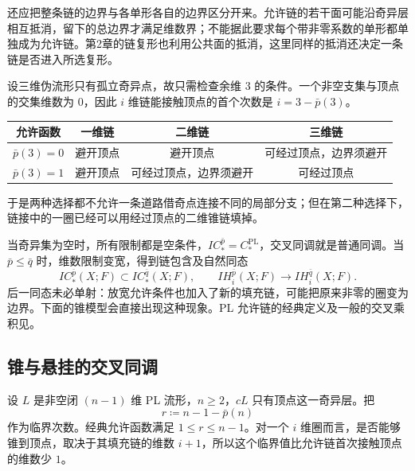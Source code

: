 \ProseParagraphBreak

还应把整条链的边界与各单形各自的边界区分开来。允许链的若干面可能沿奇异层相互抵消，留下的总边界才满足维数界；不能据此要求每个带非零系数的单形都单独成为允许链。第2章的链复形也利用公共面的抵消，这里同样的抵消还决定一条链是否进入所选复形。

\begin{example}\label{g2:exm:allowable-isolated-three-point}
	设三维伪流形只有孤立奇异点，故只需检查余维 \(3\) 的条件。一个非空支集与顶点的交集维数为 \(0\)，因此 \(i\) 维链能接触顶点的首个次数是 \(i=3-\bar p(3)\)。
	\begin{center}
		\begin{tabular}{@{}c c c c@{}}
			\toprule
			允许函数 & 一维链 & 二维链 & 三维链 \\
			\midrule
			\(\bar p(3)=0\) & 避开顶点 & 避开顶点 & 可经过顶点，边界须避开 \\
			\(\bar p(3)=1\) & 避开顶点 & 可经过顶点，边界须避开 & 可经过顶点 \\
			\bottomrule
		\end{tabular}
	\end{center}
	于是两种选择都不允许一条道路借奇点连接不同的局部分支；但在第二种选择下，链接中的一圈已经可以用经过顶点的二维锥链填掉。
\end{example}

当奇异集为空时，所有限制都是空条件，\(IC_*^{\bar p}=C_*^{\mathrm{PL}}\)，交叉同调就是普通同调。当 \(\bar p\le\bar q\) 时，维数限制变宽，得到链包含及自然同态
\[
	IC_*^{\bar p}(X;F)\subset IC_*^{\bar q}(X;F),\qquad
	IH_i^{\bar p}(X;F)\longrightarrow IH_i^{\bar q}(X;F).
\]
后一同态未必单射：放宽允许条件也加入了新的填充链，可能把原来非零的圈变为边界。下面的锥模型会直接出现这种现象。PL 允许链的经典定义及一般的交叉乘积见\cite[第1--2节]{GoreskyMacPherson1980Intersection}。

\subsection{锥与悬挂的交叉同调}
\label{g2:subsec:B03:03}

设 \(L\) 是非空闭 \((n-1)\) 维 PL 流形，\(n\ge2\)，\(cL\) 只有顶点这一奇异层。把
\[
	r\coloneqq n-1-\bar p(n)
\]
作为临界次数。经典允许函数满足 \(1\le r\le n-1\)。对一个 \(i\) 维圈而言，是否能够锥到顶点，取决于其填充链的维数 \(i+1\)，所以这个临界值比允许链首次接触顶点的维数少 \(1\)。

